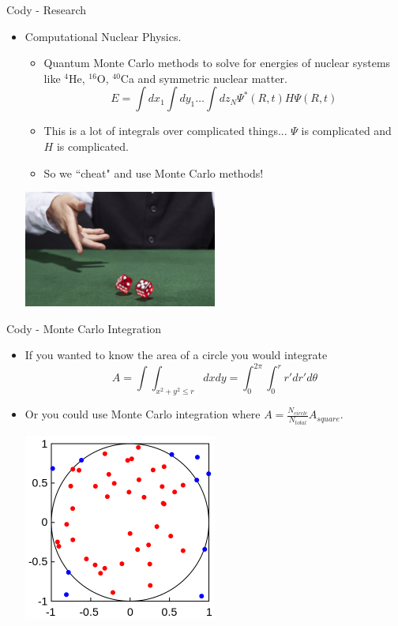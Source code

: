 \documentclass{beamer}
\begin{document}
\begin{frame}{Cody - Research}
   \begin{itemize}
      \item Computational Nuclear Physics.
      \begin{itemize}
         \item Quantum Monte Carlo methods to solve for energies of nuclear systems like $^4$He, $^{16}$O, $^{40}$Ca and symmetric nuclear matter.
         \begin{equation}
            E = \int dx_1 \int dy_1 \ldots \int dz_N \Psi^*(R,t) H \Psi(R,t)
         \end{equation}
         \item This is a lot of integrals over complicated things... $\Psi$ is complicated and $H$ is complicated.
         \item So we ``cheat" and use Monte Carlo methods!
      \end{itemize}
      \begin{center}
         \includegraphics[width=0.5\textwidth]{figures/dice.jpg}
      \end{center}
   \end{itemize}
\end{frame}

\begin{frame}{Cody - Monte Carlo Integration}
   \begin{itemize}
      \item If you wanted to know the area of a circle you would integrate
      \begin{equation}
         A = \int \int_{x^2+y^2\le r} dx dy = \int_0^{2\pi} \int_0^r r' dr' d\theta
      \end{equation}
      \item Or you could use Monte Carlo integration where $A=\frac{N_{circle}}{N_{total}}A_{square}$.
      \begin{center}
         \includegraphics[width=0.5\textwidth]{figures/circle.png}
      \end{center}
   \end{itemize}
\end{frame}
\end{document}
